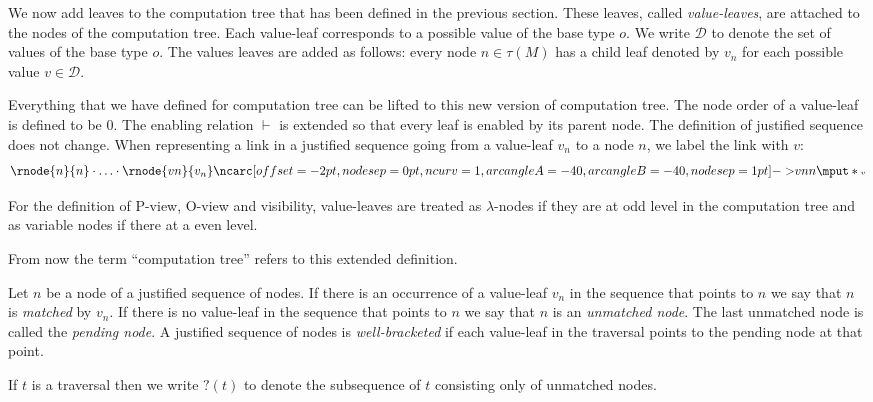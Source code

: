 We now add leaves to the computation tree that has been defined in the previous section.
These leaves, called \emph{value-leaves}, are attached to the nodes of the computation tree. Each
value-leaf corresponds to a possible value of the base type $o$.
We write $\mathcal{D}$ to denote the set of values of the base type
$o$. The values leaves are added as follows: every  %
node $n \in \tau(M)$ has a child leaf denoted by $v_n$ for each possible value $v \in \mathcal{D}$.



Everything that we have defined for computation tree can be lifted
to this new version of computation tree. The node order of a
value-leaf is defined to be $0$. The enabling relation $\vdash$ is
extended so that every leaf is enabled by its parent node. The
definition of justified sequence does not change.
When representing a link in a justified sequence going from a value-leaf $v_n$ to a node $n$,
we label the link with $v$:
$$
\rnode{n}{n} \cdot \ldots \cdot \rnode{vn}{v_n} \bkptr[nodesep=1pt]{40}{vn}{n} \bklabel{v}
$$


For the definition
of P-view, O-view and visibility, value-leaves are treated as
$\lambda$-nodes if they are at odd level in the computation tree and
as variable nodes if there at a even level.

From now the term ``computation tree'' refers to this extended
definition.
\vspace{10pt}

Let $n$ be a node of a justified sequence of nodes.
If there is an occurrence of a value-leaf $v_n$ in the sequence that points to $n$ we say that
$n$ is \emph{matched} by $v_n$. If there is no value-leaf in the sequence that points to $n$ we
say that $n$ is an \emph{unmatched node}.
The last unmatched node is called the \emph{pending node}.
A justified sequence of nodes is \emph{well-bracketed} if
each value-leaf in the traversal points to the pending node at that point.

If $t$ is a traversal then we write $?(t)$ to denote the subsequence
of $t$ consisting only of unmatched nodes.

